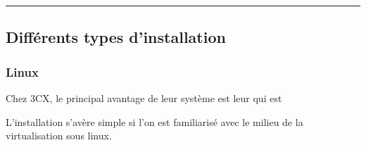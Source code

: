 \documentclass[letterpaper,10pt,french]{sphinxmanual}
\begin{document}


\bigskip\hrule\bigskip



\subsection{Différents types d’installation}
\label{\detokenize{Documentation-M362:differents-types-d-installation}}
\sphinxAtStartPar


\sphinxAtStartPar



\subsubsection{Linux}
\label{\detokenize{Documentation-M362:linux}}
\sphinxAtStartPar


\sphinxAtStartPar
Chez 3CX, le principal avantage de leur système est leur  qui est 

\sphinxAtStartPar
L’installation s’avère simple si l’on est familiarisé avec le milieu de la virtualisation sous linux.

\sphinxAtStartPar


\sphinxAtStartPar
{}
\end{document}
